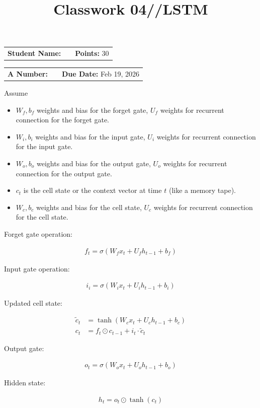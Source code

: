 \documentclass[12pt, xcolor=dvipsnames,svgnames,x11names]{article}
\makeatletter
\newcommand{\hw}{Classwork 04//LSTM}
\newcommand{\duedate}{Feb 19, 2026}
\renewcommand{\maketitle}{%
    \vspace*{0.2cm}
    \begin{center}
        \begin{tcolorbox}[
            enhanced,
            colback=white,
            colframe=headerRed,
            arc=0mm,
            title={\textcolor{white}{\bfseries \@title}},
            coltitle=white,
            fonttitle=\bfseries\large,
            attach boxed title to top left={xshift=10pt, yshift=-\tcboxedtitleheight/2},
            boxed title style={sharp corners, colback=headerRed, frame hidden}
        ]
        \large
        \vspace{10pt}
\noindent
\begin{tabular}{@{}p{3.5cm}p{6cm}r@{}}
\textbf{Student Name:} & \underline{\hspace{6cm}} & \textbf{Points:} 30 \\
\end{tabular}

\vspace{10pt}

\noindent
\begin{tabular}{@{}p{3.5cm}p{6cm}r@{}}
\textbf{A Number:} & \underline{\hspace{6cm}} & \textbf{Due Date:} \duedate \\
\end{tabular}
        \end{tcolorbox}
    \end{center}
    \vspace{10pt}
}
\makeatother
\begin{document}
\title{\hw}
\maketitle

Assume
\begin{itemize}
\item $W_f , b_f$ weights and bias for the forget gate, $U_f$ weights for recurrent connection for the forget gate.

\item $W_i , b_i$ weights and bias for the input gate, $U_i$ weights for recurrent connection for the input gate.

\item $W_o , b_o$ weights and bias for the output gate, $U_o$ weights for recurrent connection for the output gate.

\item $c_t$ is the cell state or the context vector at time $t$ (like a memory tape).

\item $W_c , b_c$ weights and bias for the cell state, $U_c$ weights for recurrent connection for the cell state.


\end{itemize}


Forget gate operation:

\begin{align*}
f_t = \sigma(W_f x_t + U_f h_{t-1} + b_f)
\end{align*}

Input gate operation:

\begin{align*}
i_i = \sigma(W_i x_t + U_i h_{t-1} + b_i)
\end{align*}

Updated cell state:

\begin{align*}
\tilde{c}_t & = \tanh(W_c x_t + U_c h_{t-1} + b_c)\\
c_t & = f_t \odot c_{t-1} + i_t \cdot \tilde{c}_t
\end{align*}

Output gate:

\begin{align*}
o_t = \sigma(W_o x_t + U_o h_{t-1} + b_o)
\end{align*}

Hidden state:

\begin{align*}
h_t = o_t \odot \tanh(c_t)
\end{align*}
\end{document}
